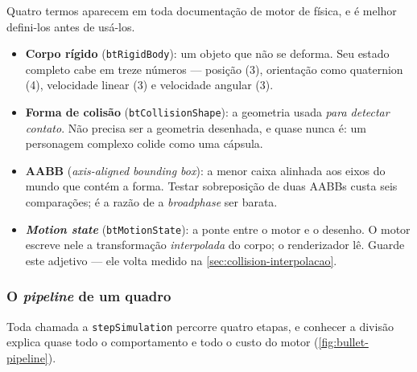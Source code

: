 Quatro termos aparecem em toda documentação de motor de física, e é melhor
defini-los antes de usá-los.

\begin{itemize}
  \item \textbf{Corpo rígido} (\texttt{btRigidBody}): um objeto que não se
        deforma. Seu estado completo cabe em treze números --- posição (3),
        orientação como quaternion (4), velocidade linear (3) e velocidade
        angular (3).
  \item \textbf{Forma de colisão} (\texttt{btCollisionShape}): a geometria usada
        \emph{para detectar contato}. Não precisa ser a geometria desenhada, e
        quase nunca é: um personagem complexo colide como uma cápsula.
  \item \textbf{AABB} (\emph{axis-aligned bounding box}): a menor caixa alinhada
        aos eixos do mundo que contém a forma. Testar sobreposição de duas AABBs
        custa seis comparações; é a razão de a \emph{broadphase} ser barata.
  \item \textbf{\emph{Motion state}} (\texttt{btMotionState}): a ponte entre o
        motor e o desenho. O motor escreve nele a transformação
        \emph{interpolada} do corpo; o renderizador lê. Guarde este adjetivo ---
        ele volta medido na \cref{sec:collision-interpolacao}.
\end{itemize}

\subsubsection{O \emph{pipeline} de um quadro}

Toda chamada a \texttt{stepSimulation} percorre quatro etapas, e conhecer a
divisão explica quase todo o comportamento e todo o custo do motor
(\cref{fig:bullet-pipeline}).

